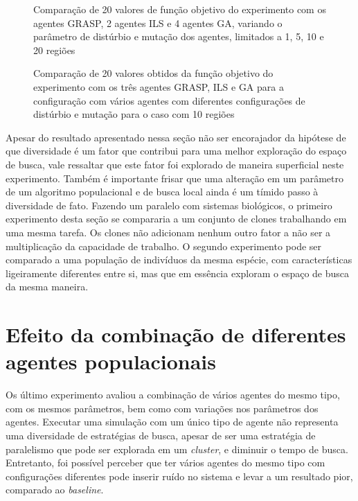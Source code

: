 \begin{figure}[ht!]
    \centering
    \caption{Comparação de 20 valores de função objetivo do experimento com os agentes GRASP, 2 agentes ILS e 4 agentes GA, variando o parâmetro de distúrbio e mutação dos agentes, limitados a 1, 5, 10 e 20 regiões}
    
    \label{fig:A02boxplot}
\end{figure}

\begin{figure}[ht!]
    \centering
    \caption{Comparação de 20 valores obtidos da função objetivo do experimento com os três agentes GRASP, ILS e GA para a configuração com vários agentes com diferentes configurações de distúrbio e mutação para o caso com 10 regiões}%
    
    \label{fig:A0A02boxplot}
\end{figure}

Apesar do resultado apresentado nessa seção não ser encorajador da hipótese de que diversidade é um fator que contribui para uma melhor exploração do espaço de busca, vale ressaltar que este fator foi explorado de maneira superficial neste experimento. Também é importante frisar que uma alteração em um parâmetro de um algoritmo populacional e de busca local ainda é um tímido passo à diversidade de fato. Fazendo um paralelo com sistemas biológicos, o primeiro experimento desta seção se compararia a um conjunto de clones trabalhando em uma mesma tarefa. Os clones não adicionam nenhum outro fator a não ser a multiplicação da capacidade de trabalho. O segundo experimento pode ser comparado a uma população de indivíduos da mesma espécie, com características ligeiramente diferentes entre si, mas que em essência exploram o espaço de busca da mesma maneira. 

\section{Efeito da combinação de diferentes agentes populacionais} 
\label{sec:diversidade}

Os último experimento avaliou a combinação de vários agentes do mesmo tipo, com os mesmos parâmetros, bem como com variações nos parâmetros dos agentes.  Executar  uma simulação com um único tipo de agente não representa uma diversidade de estratégias de busca, apesar de ser uma estratégia de paralelismo que pode ser explorada em um \textit{cluster}, e diminuir o tempo de busca. Entretanto, foi possível perceber que ter vários agentes do mesmo tipo com configurações diferentes pode inserir ruído no sistema e levar a um resultado pior, comparado ao \textit{baseline}. 


